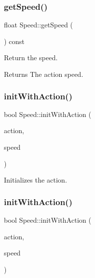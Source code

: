 \subsubsection{\texorpdfstring{get\+Speed()}{getSpeed()}\hspace{0.1cm}{\footnotesize\ttfamily [2/2]}}
{\footnotesize\ttfamily float Speed\+::get\+Speed (\begin{DoxyParamCaption}\item[{void}]{ }\end{DoxyParamCaption}) const\hspace{0.3cm}{\ttfamily [inline]}}

Return the speed.

\begin{DoxyReturn}{Returns}
The action speed. 
\end{DoxyReturn}
\mbox{\label{classSpeed_a4e2c8023a20b7093c9dd8f5b6838ef70}} 
\subsubsection{\texorpdfstring{init\+With\+Action()}{initWithAction()}\hspace{0.1cm}{\footnotesize\ttfamily [1/2]}}
{\footnotesize\ttfamily bool Speed\+::init\+With\+Action (\begin{DoxyParamCaption}\item[{\hyperlink{classActionInterval}{Action\+Interval} $\ast$}]{action,  }\item[{float}]{speed }\end{DoxyParamCaption})}

Initializes the action. \mbox{\label{classSpeed_a4e2c8023a20b7093c9dd8f5b6838ef70}} 
\subsubsection{\texorpdfstring{init\+With\+Action()}{initWithAction()}\hspace{0.1cm}{\footnotesize\ttfamily [2/2]}}
{\footnotesize\ttfamily bool Speed\+::init\+With\+Action (\begin{DoxyParamCaption}\item[{\hyperlink{classActionInterval}{Action\+Interval} $\ast$}]{action,  }\item[{float}]{speed }\end{DoxyParamCaption})}


